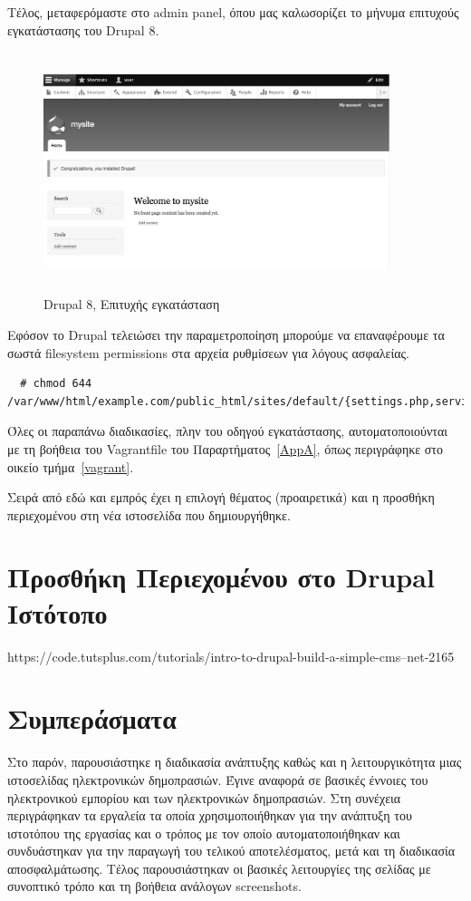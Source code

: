 \documentclass[12pt]{report}
\begin{document}
Τέλος, μεταφερόμαστε στο \textlatin{admin panel}, όπου μας καλωσορίζει το μήνυμα επιτυχούς εγκατάστασης του \textlatin{Drupal 8}.
\begin{figure}[H]
\centering
\includegraphics[width=0.9\textwidth, height=7cm]{drupal-gray}
\caption{\textlatin{Drupal 8}, Επιτυχής εγκατάσταση}
\label{fig:drupal_success}
\end{figure}

Εφόσον το \textlatin{Drupal} τελειώσει την παραμετροποίηση μπορούμε να επαναφέρουμε τα σωστά \textlatin{filesystem permissions} στα αρχεία ρυθμίσεων για λόγους ασφαλείας.
\scriptsize
\begin{verbatim}
  # chmod 644 /var/www/html/example.com/public_html/sites/default/{settings.php,services.yml}
\end{verbatim}
\normalsize
{}

Όλες οι παραπάνω διαδικασίες, πλην του οδηγού εγκατάστασης, αυτοματοποιούνται με τη βοήθεια του \textlatin{Vagrantfile} του Παραρτήματος~\ref{AppA}, όπως περιγράφηκε στο οικείο τμήμα~\ref{vagrant}.

Σειρά από εδώ και εμπρός έχει η επιλογή θέματος (προαιρετικά) και η προσθήκη περιεχομένου στη νέα ιστοσελίδα που δημιουργήθηκε.

\section{Προσθήκη Περιεχομένου στο \textlatin{Drupal} Ιστότοπο}
https://code.tutsplus.com/tutorials/intro-to-drupal-build-a-simple-cms--net-2165

\section{Συμπεράσματα}
Στο παρόν, παρουσιάστηκε η διαδικασία ανάπτυξης καθώς και η λειτουργικότητα μιας ιστοσελίδας ηλεκτρονικών δημοπρασιών. Έγινε αναφορά σε βασικές έννοιες του ηλεκτρονικού εμπορίου και των ηλεκτρονικών δημοπρασιών. Στη συνέχεια περιγράφηκαν τα εργαλεία τα οποία χρησιμοποιήθηκαν για την ανάπτυξη του ιστοτόπου της εργασίας και ο τρόπος με τον οποίο αυτοματοποιήθηκαν και συνδυάστηκαν για την παραγωγή του τελικού αποτελέσματος, μετά και τη διαδικασία αποσφαλμάτωσης. Τέλος παρουσιάστηκαν οι βασικές λειτουργίες της σελίδας με συνοπτικό τρόπο και τη βοήθεια ανάλογων \textlatin{screenshots}.
\end{document}
